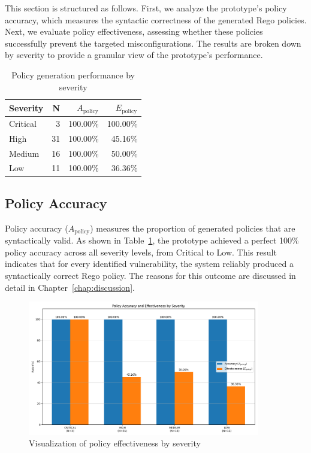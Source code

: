 This section is structured as follows. First, we analyze the prototype's policy accuracy, which measures the syntactic correctness of the generated Rego policies. Next, we evaluate policy effectiveness, assessing whether these policies successfully prevent the targeted misconfigurations. The results are broken down by severity to provide a granular view of the prototype's performance.

\begin{table}[htbp]
	\centering
		\caption{Policy generation performance by severity}\label{tab:effectiveness-by-severity}
	\begin{tabular}{lrrr}
		\hline
		Severity & N & $A_{\text{policy}}$ & $E_{\text{policy}}$ \\
		\hline
		Critical & 3 & 100.00\% & 100.00\% \\
		High & 31 & 100.00\% & 45.16\% \\
		Medium & 16 & 100.00\% & 50.00\% \\
		Low & 11 & 100.00\% & 36.36\% \\
		\hline
	\end{tabular}
\end{table}

\subsection{Policy Accuracy}
Policy accuracy ($A_{\text{policy}}$) measures the proportion of generated policies that are syntactically valid. As shown in Table~\ref{tab:effectiveness-by-severity}, the prototype achieved a perfect 100\% policy accuracy across all severity levels, from Critical to Low. This result indicates that for every identified vulnerability, the system reliably produced a syntactically correct Rego policy. The reasons for this outcome are discussed in detail in Chapter~\ref{chap:discussion}.

\begin{figure}[htbp]
	\centering
	\includegraphics[width=0.9\textwidth]{Figures/effectiveness_by_severity.png}
	\caption{Visualization of policy effectiveness by severity}\label{fig:effectiveness-plot}
\end{figure}

